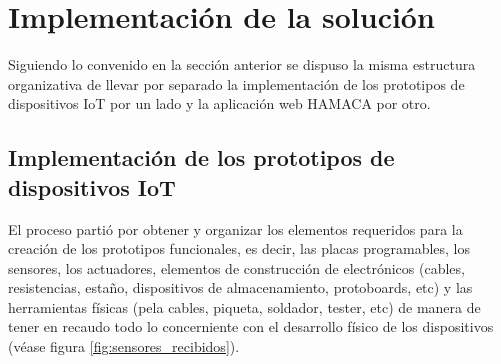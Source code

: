 \section{Implementación de la solución}
Siguiendo lo convenido en la sección anterior se dispuso la misma estructura organizativa de llevar por separado la implementación de los prototipos de dispositivos IoT por un lado y la aplicación web HAMACA por otro.

\subsection{Implementación de los prototipos de dispositivos IoT}
El proceso partió por obtener y organizar los elementos requeridos para la creación de los prototipos funcionales, es decir, las placas programables, los sensores, los actuadores, elementos de construcción de electrónicos (cables, resistencias, estaño, dispositivos de almacenamiento, protoboards, etc) y las herramientas físicas (pela cables, piqueta, soldador, tester, etc)  de manera de tener en recaudo todo lo concerniente con el desarrollo físico de los dispositivos (véase figura \ref{fig:sensores_recibidos}).\\
